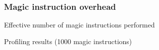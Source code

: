 
\begin{frame}
\frametitle{Magic instruction overhead}

\begin{block}{Effective number of magic instructions performed}
\center
\resizebox{\linewidth}{!}{%
	
}
\end{block}

\begin{block}{Profiling results (1000 magic instructions)}

\end{block}

\end{frame}